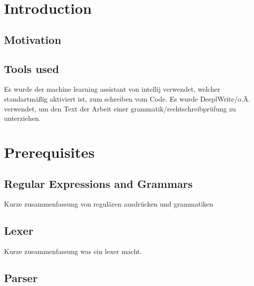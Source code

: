 %
%

\section{Introduction}

\subsection{Motivation}


\subsection{Tools used}

Es wurde der machine learning assistant von intellij verwendet, welcher standartmäßig aktiviert ist, zum schreiben vom Code. Es wurde DeeplWrite/o.Ä. verwendet, um den Text der Arbeit einer grammatik/rechtschreibprüfung zu unterziehen.

\section{Prerequisites}

\subsection{Regular Expressions and Grammars}

Kurze zusammenfassung von regulären ausdrücken und grammatiken

\subsection{Lexer}

Kurze zusammenfassung was ein lexer macht.

\subsection{Parser}

